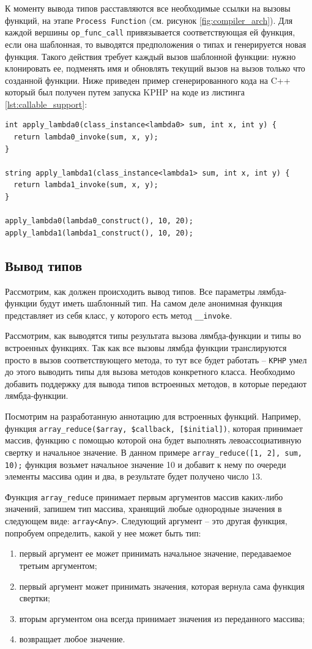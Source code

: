 К моменту вывода типов расставляются все необходимые ссылки на вызовы функций, на этапе \verb|Process Function| (см. рисунок \ref{fig:compiler_arch}).
Для каждой вершины \verb|op_func_call| привязывается соответствующая ей функция, если она шаблонная, то выводятся предположения о типах и генерируется новая функция.
Такого действия требует каждый вызов шаблонной функции: нужно клонировать ее, подменять имя и обновлять текущий вызов на вызов только что созданной функции.
Ниже приведен пример сгенерированного кода на C++ который был получен путем запуска KPHP на коде из листинга \ref{lst:callable_support}:
\begin{lstlisting}
int apply_lambda0(class_instance<lambda0> sum, int x, int y) {
  return lambda0_invoke(sum, x, y);
}

string apply_lambda1(class_instance<lambda1> sum, int x, int y) {
  return lambda1_invoke(sum, x, y);
}

apply_lambda0(lambda0_construct(), 10, 20);
apply_lambda1(lambda1_construct(), 10, 20);
\end{lstlisting}

\subsection{Вывод типов}
Рассмотрим, как должен происходить вывод типов.
Все параметры лямбда-функции будут иметь шаблонный тип.
На самом деле анонимная функция представляет из себя класс, у которого есть метод \verb|__invoke|.

Рассмотрим, как выводятся типы результата вызова лямбда-функции и типы во встроенных функциях.
Так как все вызовы лямбда функции транслируются просто в вызов соответствующего метода, то тут все будет работать -- \verb|KPHP| умел до этого выводить типы для вызова методов конкретного класса.
Необходимо добавить поддержку для вывода типов встроенных методов, в которые передают лямбда-функции.

Посмотрим на разработанную аннотацию для встроенных функций.
Например, функция \verb|array_reduce($array, $callback, [$initial])|, которая принимает массив, функцию с помощью которой она будет выполнять левоассоциативную свертку \cite{foldl} и начальное значение.
В данном примере \verb|array_reduce([1, 2], sum, 10);| функция возьмет начальное значение 10 и добавит к нему по очереди элементы массива один и два, в результате будет получено число 13.

Функция \verb|array_reduce| принимает первым аргументов массив каких-либо значений, запишем тип массива, хранящий любые однородные значения в следующем виде: \verb|array<Any>|.
Следующий аргумент -- это другая функция, попробуем определить, какой у нее может быть тип:
\begin{enumerate}
  \item первый аргумент ее может принимать начальное значение, передаваемое третьим аргументом;
  \item первый аргумент может принимать значения, которая вернула сама функция свертки;
  \item вторым аргументом она всегда принимает значения из переданного массива;
  \item возвращает любое значение.
\end{enumerate}


